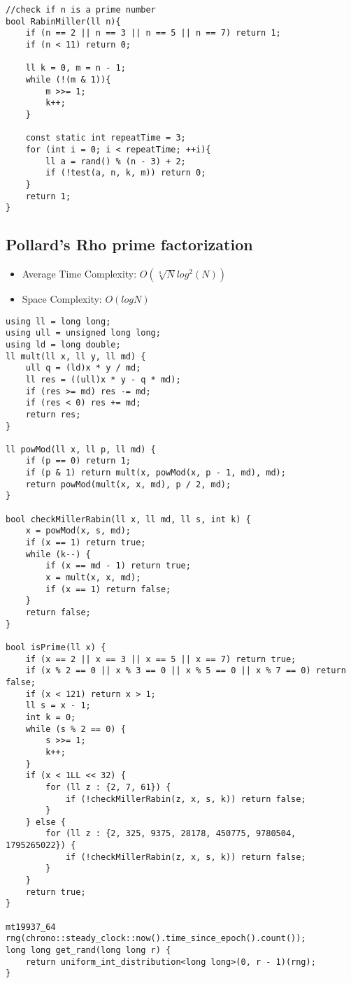 \documentclass[11pt,a4paper]{article}
\begin{document}
\begin{multicols*}{2}
\begin{lstlisting}
//check if n is a prime number
bool RabinMiller(ll n){
    if (n == 2 || n == 3 || n == 5 || n == 7) return 1;
    if (n < 11) return 0;

    ll k = 0, m = n - 1;
    while (!(m & 1)){
        m >>= 1;
        k++;
    }

    const static int repeatTime = 3;
    for (int i = 0; i < repeatTime; ++i){
        ll a = rand() % (n - 3) + 2;
        if (!test(a, n, k, m)) return 0;
    }
    return 1;
}
\end{lstlisting}

\subsection{Pollard's Rho prime factorization}
\begin{itemize}
    \item Average Time Complexity: $O(\sqrt[4]{N}log^2(N))$
    \item Space Complexity: $O(logN)$
\end{itemize}
\begin{lstlisting}
using ll = long long;
using ull = unsigned long long;
using ld = long double;
ll mult(ll x, ll y, ll md) {
    ull q = (ld)x * y / md;
    ll res = ((ull)x * y - q * md);
    if (res >= md) res -= md;
    if (res < 0) res += md;
    return res;
}

ll powMod(ll x, ll p, ll md) {
    if (p == 0) return 1;
    if (p & 1) return mult(x, powMod(x, p - 1, md), md);
    return powMod(mult(x, x, md), p / 2, md);
}

bool checkMillerRabin(ll x, ll md, ll s, int k) {
    x = powMod(x, s, md);
    if (x == 1) return true;
    while (k--) {
        if (x == md - 1) return true;
        x = mult(x, x, md);
        if (x == 1) return false;
    }
    return false;
}

bool isPrime(ll x) {
    if (x == 2 || x == 3 || x == 5 || x == 7) return true;
    if (x % 2 == 0 || x % 3 == 0 || x % 5 == 0 || x % 7 == 0) return false;
    if (x < 121) return x > 1;
    ll s = x - 1;
    int k = 0;
    while (s % 2 == 0) {
        s >>= 1;
        k++;
    }
    if (x < 1LL << 32) {
        for (ll z : {2, 7, 61}) {
            if (!checkMillerRabin(z, x, s, k)) return false;
        }
    } else {
        for (ll z : {2, 325, 9375, 28178, 450775, 9780504, 1795265022}) {
            if (!checkMillerRabin(z, x, s, k)) return false;
        }
    }
    return true;
}

mt19937_64 rng(chrono::steady_clock::now().time_since_epoch().count());
long long get_rand(long long r) {
    return uniform_int_distribution<long long>(0, r - 1)(rng);
}


\end{lstlisting}
\end{multicols*}
\end{document}
